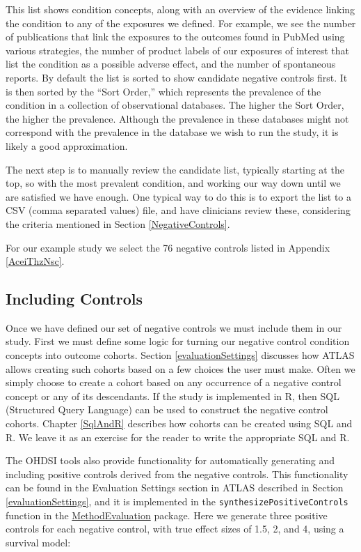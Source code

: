 \documentclass[11pt]{book}
\theoremstyle{definition}
\theoremstyle{definition}
\theoremstyle{definition}
\theoremstyle{remark}
\begin{document}
This list shows condition concepts, along with an overview of the
evidence linking the condition to any of the exposures we defined. For
example, we see the number of publications that link the exposures to
the outcomes found in PubMed using various strategies, the number of
product labels of our exposures of interest that list the condition as a
possible adverse effect, and the number of spontaneous reports. By
default the list is sorted to show candidate negative controls first. It
is then sorted by the ``Sort Order,'' which represents the prevalence of
the condition in a collection of observational databases. The higher the
Sort Order, the higher the prevalence. Although the prevalence in these
databases might not correspond with the prevalence in the database we
wish to run the study, it is likely a good approximation.

The next step is to manually review the candidate list, typically
starting at the top, so with the most prevalent condition, and working
our way down until we are satisfied we have enough. One typical way to
do this is to export the list to a CSV (comma separated values) file,
and have clinicians review these, considering the criteria mentioned in
Section \ref{NegativeControls}.

For our example study we select the 76 negative controls listed in
Appendix \ref{AceiThzNsc}.

\subsection{Including Controls}\label{including-controls}

Once we have defined our set of negative controls we must include them
in our study. First we must define some logic for turning our negative
control condition concepts into outcome cohorts. Section
\ref{evaluationSettings} discusses how ATLAS allows creating such
cohorts based on a few choices the user must make. Often we simply
choose to create a cohort based on any occurrence of a negative control
concept or any of its descendants. If the study is implemented in R,
then SQL (Structured Query Language) can be used to construct the
negative control cohorts. Chapter \ref{SqlAndR} describes how cohorts
can be created using SQL and R. We leave it as an exercise for the
reader to write the appropriate SQL and R.

The OHDSI tools also provide functionality for automatically generating
and including positive controls derived from the negative controls. This
functionality can be found in the Evaluation Settings section in ATLAS
described in Section \ref{evaluationSettings}, and it is implemented in
the \texttt{synthesizePositiveControls} function in the
\href{https://ohdsi.github.io/MethodEvaluation/}{MethodEvaluation}
package. Here we generate three positive controls for each negative
control, with true effect sizes of 1.5, 2, and 4, using a survival
model:
\end{document}
